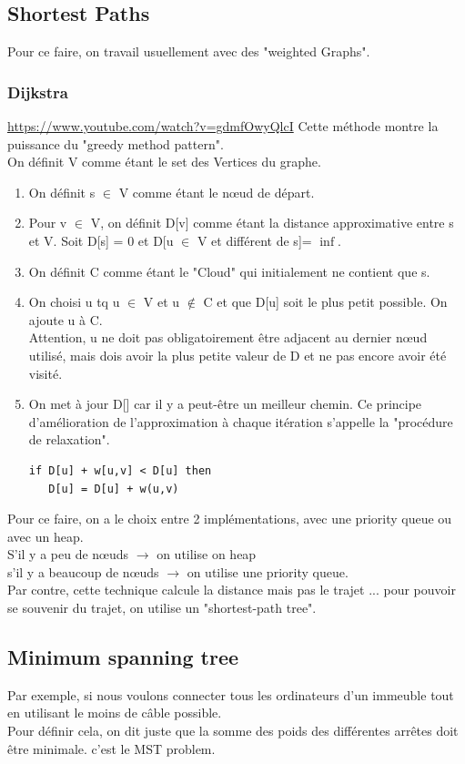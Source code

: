\documentclass[a4paper]{article}
\begin{document}
\subsection{Shortest Paths}
Pour ce faire, on travail usuellement avec des "weighted Graphs".
\subsubsection{Dijkstra}
\url{https://www.youtube.com/watch?v=gdmfOwyQlcI}
Cette méthode montre la puissance du "greedy method pattern".\\
On définit V comme étant le set des Vertices du graphe.
\begin{enumerate}
\item On définit s $\in$ V comme étant le nœud de départ.
\item Pour v $\in$ V, on définit D[v] comme étant la distance approximative entre s et V. Soit D[s] = 0 et D[u $\in$ V et différent de s]= $\inf$.
\item On définit C comme étant le "Cloud" qui initialement ne contient que s.
\item On choisi u tq u $\in$ V et u $\notin$ C et que D[u] soit le plus petit possible. On ajoute u à C.\\
Attention, u ne doit pas obligatoirement être adjacent au dernier nœud utilisé, mais dois avoir la plus petite valeur de D et ne pas encore avoir été visité.
\item On met à jour D[] car il y a peut-être un meilleur chemin. Ce principe d'amélioration de l'approximation à chaque itération s'appelle la "procédure de relaxation".
\begin{verbatim}
if D[u] + w[u,v] < D[u] then
   D[u] = D[u] + w(u,v)
\end{verbatim}
\end{enumerate}

Pour ce faire, on a le choix entre 2 implémentations, avec une priority queue ou avec un heap.\\
S'il y a peu de nœuds $\rightarrow$ on utilise on heap\\
s'il y a beaucoup de nœuds $\rightarrow$ on utilise une priority queue.\\

Par contre, cette technique calcule la distance mais pas le trajet ... pour pouvoir se souvenir du trajet, on utilise un "shortest-path tree".

\subsection{Minimum spanning tree}
Par exemple, si nous voulons connecter tous les ordinateurs d'un immeuble tout en utilisant le moins de câble possible.\\
Pour définir cela, on dit juste que la somme des poids des différentes arrêtes doit être minimale. c'est le MST problem.
\end{document}
